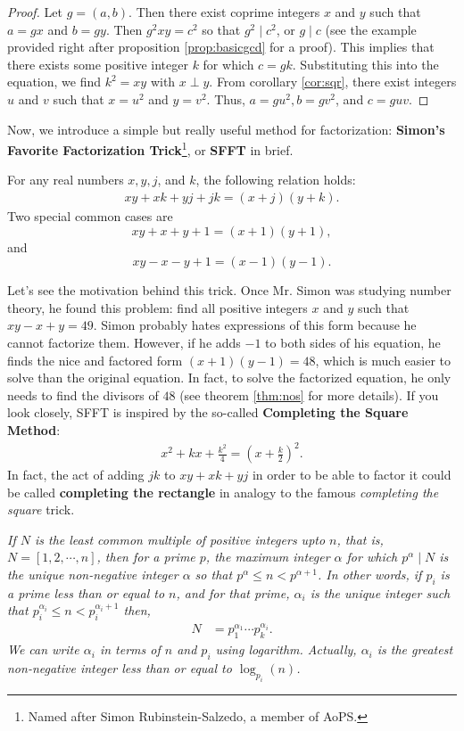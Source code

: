 \documentclass{subfile}
\begin{document}
	\begin{proof}
		Let $g=(a,b)$. Then there exist coprime integers $x$ and $y$ such that $a=gx$ and $b=gy$. Then $g^2xy=c^2$ so that $g^2\mid c^2$, or $g\mid c$ (see the example provided right after proposition \eqref{prop:basicgcd} for a proof). This implies that there exists some positive integer $k$ for which $c=gk$. Substituting this into the equation, we find $k^2=xy$ with $x\perp y$. From corollary \eqref{cor:sqr}, there exist integers $u$ and $v$ such that $x=u^2$ and $y=v^2$. Thus, $a=gu^2,b=gv^2$, and $c=guv$.
	\end{proof}
	Now, we introduce a simple but really useful method for factorization: \textbf{Simon's Favorite Factorization Trick}\footnote{Named after Simon Rubinstein-Salzedo, a member of AoPS.}, or \textbf{SFFT} in brief.
	\begin{proposition}[SFFT]
		For any real numbers $x,y, j$, and $k$, the following relation holds:
		\begin{align*}
			xy+xk+yj+jk=(x+j)(y+k).
		\end{align*}
		Two special common cases are $$xy + x + y + 1 = (x+1)(y+1),$$ and $$xy - x - y +1 = (x-1)(y-1).$$
	\end{proposition}
	Let's see the motivation behind this trick. Once Mr. Simon was studying number theory, he found this problem: find all positive integers $x$ and $y$ such that $xy-x+y=49$. Simon probably hates expressions of this form because he cannot factorize them. However, if he adds $-1$ to both sides of his equation, he finds the nice and factored form $(x+1)(y-1)=48$, which is much easier to solve than the original equation. In fact, to solve the factorized equation, he only needs to find the divisors of $48$ (see theorem \eqref{thm:nos} for more details). If you look closely, SFFT is inspired by the so-called \textbf{Completing the Square Method}:
	\begin{align*}
		x^2+kx+\frac{k^2}{4}=\left(x+\frac{k}{2}\right)^2.
	\end{align*}
	In fact, the act of adding ${jk}$ to ${xy}+{xk}+{yj}$ in order to be able to factor it could be called \textbf{completing the rectangle} in analogy to the famous \textit{completing the square} trick.
	\begin{theorem}\slshape\label{thm:lcmfactor}
		If $N$ is the least common multiple of positive integers upto $n$, that is, $N=[1,2,\cdots,n]$, then for a prime $p$, the maximum  integer $\alpha$ for which $p^\alpha\mid N$ is the unique non-negative integer $\alpha$ so that $p^\alpha\leq n<p^{\alpha+1}$. In other words, if $p_i$ is a prime less than or equal to $n$, and for that prime, $\alpha_i$ is the unique integer such that $p_i^{\alpha _i}\leq n<p_i^{\alpha_i+1}$ then,
		\begin{align*}
			N & = p_1^{\alpha _1}\cdots p_k^{\alpha_i}.
		\end{align*}\label{thm:lcm}
		We can write $\alpha _i$ in terms of $n$ and $p_i$ using logarithm. Actually, $\alpha_i$ is the greatest non-negative integer less than or equal to $\log_{p_i}(n)$.
	\end{theorem}
\end{document}
